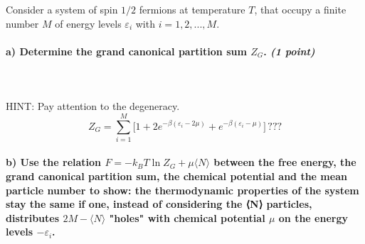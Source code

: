 Consider a system of spin $1/2$ fermions at temperature $T$, 
that occupy a finite number $M$ of energy levels 
$\varepsilon_i$ with $i=1,2,...,M$.


\paragraph{a) Determine the grand canonical partition sum $Z_G$.
    \textit{(1 point)}
} \ \\
    \\
    HINT: Pay attention to the degeneracy.
    \begin{equation}
        Z_G=
        \sum_{i=1}^M\bigg[
            1+2e^{
                -\beta(\varepsilon_i-2\mu)  %
            }+e^{
                -\beta(\varepsilon_i-\mu)
            }
        \bigg] \, ???
    \end{equation}

\paragraph{b) Use the relation $F=-k_BT\ln Z_G+\mu\langle N\rangle$
    between the free energy, the grand canonical partition 
    sum, the chemical potential and the mean particle number 
    to show: the thermodynamic properties of the system stay 
    the same if one, instead of considering the 
    ⟨N⟩ particles, distributes $2M-\langle N\rangle$ 
    "holes" with chemical potential $\mu$ on the energy levels
    $-\varepsilon_i$.
}
